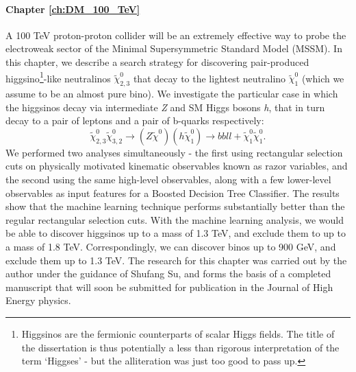 \paragraph{Chapter \ref{ch:DM_100_TeV}}
A 100 TeV proton-proton collider will be an extremely effective way to probe the electroweak sector of the Minimal Supersymmetric Standard Model (MSSM). In this chapter, we describe a search strategy for discovering pair-produced higgsino\footnote{Higgsinos are the fermionic counterparts of scalar Higgs fields. The title of the dissertation is thus potentially a less than rigorous interpretation of the term `Higgses' - but the alliteration was just too good to pass up.}-like neutralinos $\tilde{\chi}_{2,3}^0$ that decay to the lightest neutralino $\tilde{\chi}_1^0$ (which we assume to be an almost pure bino). We investigate the particular case in which the higgsinos decay via intermediate \emph{Z} and SM Higgs bosons \emph{h}, that in turn decay to a pair of leptons and a pair of b-quarks respectively: 
$$\tilde{\chi}^0_{2,3}\tilde{\chi}^0_{3,2}\rightarrow (Z\tilde{\chi}^0)(h\tilde{\chi}_1^0)\rightarrow bbll+\tilde{\chi}_1^0\tilde{\chi}_1^0.$$
We performed two analyses simultaneously - the first using rectangular selection cuts on physically motivated kinematic observables known as razor variables, and the second using the same high-level observables, along with a few lower-level observables as input features for a Boosted Decision Tree Classifier. The results show that the machine learning technique performs substantially better than the regular rectangular selection cuts. With the machine learning analysis, we would be able to discover higgsinos up to a mass of 1.3 TeV, and exclude them to up to a mass of 1.8 TeV. Correspondingly, we can discover binos up to 900 GeV, and exclude them up to 1.3 TeV. The research for this chapter was carried out by the author under the guidance of Shufang Su, and forms the basis of a completed manuscript that will soon be submitted for publication in the Journal of High Energy physics. 

